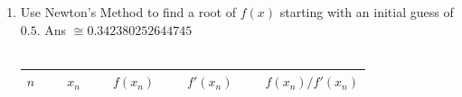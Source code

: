 \documentclass[11pt,a4paper,titlepage,oneside,openany]{article}
\numberwithin{equation}{section}
\numberwithin{algorithm}{section}
\numberwithin{figure}{section}
\numberwithin{table}{section}
\begin{document}
\begin{landscape}
\begin{enumerate}
\begin{tabular}{|l|c|c:c:c:c:c:c:c:c:c|c|c:c:c:c:c:c:c:c:c|c|c:c:c:c:c:c:c:c:c|c|c:c:c:c:c:c:c:c:c|}
$4$ & \ &
\hspace{0.4em} & \hspace{0.4em} & $\cdot$ & \hspace{0.4em} & \hspace{0.4em} & \hspace{0.4em} & \hspace{0.4em} & \hspace{0.4em} & \hspace{0.4em}  & \ &
\hspace{0.4em} & \hspace{0.4em} & $\cdot$ & \hspace{0.4em} & \hspace{0.4em} & \hspace{0.4em} & \hspace{0.4em} & \hspace{0.4em} & \hspace{0.4em}  & \ &
\hspace{0.4em} & \hspace{0.4em} & $\cdot$ & \hspace{0.4em} & \hspace{0.4em} & \hspace{0.4em} & \hspace{0.4em} & \hspace{0.4em} & \hspace{0.4em}  & \ &
\hspace{0.4em} & \hspace{0.4em} & $\cdot$ & \hspace{0.4em} & \hspace{0.4em} & \hspace{0.4em} & \hspace{0.4em} & \hspace{0.4em} & \hspace{0.4em}  \\ \hline
\end{tabular}
\\
\item
  Use Newton's Method to find a root of $f(x)$ starting with an initial guess of $0.5$. \hfill Ans $\cong 0.342380252644745$
\\
\\
\begin{tabular}{|l|c|c:c:c:c:c:c:c:c:c|c|c:c:c:c:c:c:c:c:c|c|c:c:c:c:c:c:c:c:c|c|c:c:c:c:c:c:c:c:c|}\hline
$n$ & \ &  & \ &  & \ &  & \ &  \\ \hline

\end{tabular}
\end{enumerate}
\end{landscape}
\end{document}
